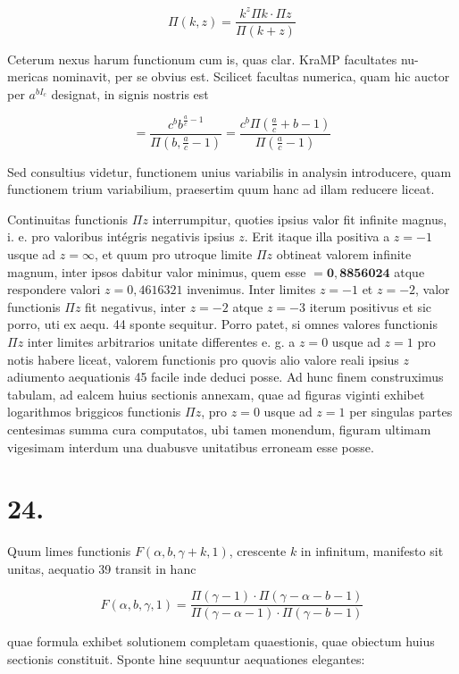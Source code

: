 \documentclass[10pt]{article}
\begin{document}
\[
\Pi(k, z)=\frac{k^{z} \Pi k \cdot \Pi z}{\Pi(k+z)}
\]

Ceterum nexus harum functionum cum is, quas clar. KraMP facultates nu-
mericas nominavit, per se obvius est. Scilicet facultas numerica, quam hic auctor per \(a^{b I_{c}}\) designat, in signis nostris est

\[
=\frac{c^{b} b^{\frac{a}{c}-1}}{\Pi\left(b, \frac{a}{c}-1\right)}=\frac{c^{b} \Pi\left(\frac{a}{c}+b-1\right)}{\Pi\left(\frac{a}{c}-1\right)}
\]

Sed consultius videtur, functionem unius variabilis in analysin introducere, quam functionem trium variabilium, praesertim quum hanc ad illam reducere liceat.

Continuitas functionis \(\Pi z\) interrumpitur, quoties ipsius valor fit infinite magnus, i. e. pro valoribus intégris negativis ipsius \(z\). Erit itaque illa positiva a \(z=-1\) usque ad \(z=\infty\), et quum pro utroque limite \(\Pi z\) obtineat valorem infinite magnum, inter ipsos dabitur valor minimus, quem esse \(=\mathbf{0 , 8 8 5 6 0 2 4}\) atque respondere valori \(z=0,4616321\) invenimus. Inter limites \(z=-1\) et \(z=-2\), valor functionis \(\Pi z\) fit negativus, inter \(z=-2\) atque \(z=-3\) iterum positivus et sic porro, uti ex aequ. 44 sponte sequitur. Porro patet, si omnes valores functionis \(\Pi z\) inter limites arbitrarios unitate differentes e. g. a \(z=0\) usque ad \(z=1\) pro notis habere liceat, valorem functionis pro quovis alio valore reali ipsius \(z\) adiumento aequationis 45 facile inde deduci posse. Ad hunc finem construximus tabulam, ad ealcem huius sectionis annexam, quae ad figuras viginti exhibet logarithmos briggicos functionis \(\Pi z\), pro \(z=0\) usque ad \(z=1\) per singulas partes centesimas summa cura computatos, ubi tamen monendum, figuram ultimam vigesimam interdum una duabusve unitatibus erroneam esse posse.

\section*{24.}
Quum limes functionis \(F(\alpha, b, \gamma+k, 1)\), crescente \(k\) in infinitum, manifesto sit unitas, aequatio 39 transit in hanc

\[
F(\alpha, b, \gamma, 1)=\frac{\Pi(\gamma-1) \cdot \Pi(\gamma-\alpha-b-1)}{\Pi(\gamma-\alpha-1) \cdot \Pi(\gamma-b-1)}
\]

quae formula exhibet solutionem completam quaestionis, quae obiectum huius sectionis constituit. Sponte hine sequuntur aequationes elegantes:
\end{document}
